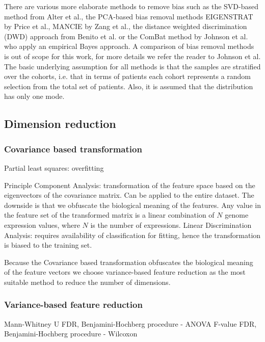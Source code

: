\documentclass[a4paper,10pt]{article}
\begin{document}
%
There are various more elaborate methods to remove bias such as the SVD-based method from Alter et al.\cite{Alter2000}, the 
PCA-based bias removal methods EIGENSTRAT by Price et al.\cite{Price2006}, MANCIE by Zang et al.\cite{Zang2016}, the distance weighted discrimination (DWD)
approach from Benito et al.\cite{Benito2005} or the ComBat method by Johnson et al.\cite{Johnson2007} who apply an empirical Bayes approach. 
A comparison of bias removal methods is out of scope for this work, for more details we refer the reader to Johnson et al\cite{Johnson2007}.
The basic underlying assumption for all methods is that the samples are stratified over the cohorts, i.e. that in terms
of patients each cohort represents a random selection from the total set of patients. Also, it is assumed that 
the distribution has only one mode.

\subsection{Dimension reduction}
\subsubsection{Covariance based transformation}

Partial least squares: overfitting

Principle Component Analysis: transformation of the feature space based on the eigenvectors 
of the covariance matrix. Can be applied to the entire dataset.  The downside is that we obfuscate the 
biological meaning of the features. Any value in the feature set of the transformed matrix is a linear combination 
of $N$ genome expression values, where $N$ is the number of expressions. 
Linear Discrimination Analysis: requires availability of classification for fitting, hence
the transformation is biased to the training set. 

Because the Covariance based transformation obfuscates the biological meaning of the feature vectors 
we choose variance-based feature reduction as the most suitable method to reduce the number of dimensions.

\subsubsection{Variance-based feature reduction}

Mann-Whitney U
FDR, Benjamini-Hochberg procedure - ANOVA F-value
FDR, Benjamini-Hochberg procedure - Wilcoxon 
\end{document}
